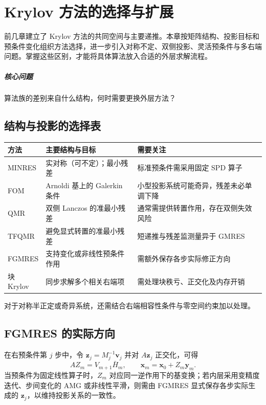 \chapter{Krylov 方法的选择与扩展}\label{v0ch:15}
\begin{chaptersummary}
前几章建立了 Krylov 方法的共同空间与主要递推。本章按矩阵结构、投影目标和预条件变化组织方法选择，进一步引入对称不定、双侧投影、灵活预条件与多右端问题。掌握这些区别，才能将具体算法放入合适的外层求解流程。
\end{chaptersummary}
\paragraph{核心问题}算法族的差别来自什么结构，何时需要更换外层方法？

\section{结构与投影的选择表}
\begin{center}\small
\begin{tabularx}{\textwidth}{lXX}
\toprule 方法&主要结构与目标&需要关注\\\midrule
MINRES&实对称（可不定）；最小残差&标准预条件需采用固定 SPD 算子\\
FOM&Arnoldi 基上的 Galerkin 条件&小型投影系统可能奇异，残差未必单调下降\\
QMR&双侧 Lanczos 的准最小残差&通常需提供转置作用，存在双侧失效风险\\
TFQMR&避免显式转置的准最小残差&短递推与残差监测量异于 GMRES\\
FGMRES&支持变化或非线性预条件作用&需额外保存各步实际修正方向\\
块 Krylov&同步求解多个相关右端项&需处理块秩亏、正交化及内存开销\\\bottomrule
\end{tabularx}
\end{center}
对于对称半正定或奇异系统，还需结合右端相容性条件与零空间约束加以处理。
\section{FGMRES 的实际方向}
在右预条件第 $j$ 步中，令 $\bm z_j=M_j^{-1}\bm v_j$ 并对 $A\bm z_j$ 正交化，可得
\[
 AZ_m=V_{m+1}\bar H_m,\qquad
 \bm x_m=\bm x_0+Z_m\bm y_m.
\]
当预条件为固定线性算子时，$Z_m$ 对应同一逆作用下的基变换；若内层采用变精度迭代、步间变化的 AMG 或非线性平滑，则需由 FGMRES 显式保存各步实际生成的 $\bm z_j$，以维持投影关系的一致性。\cite{petsc}
